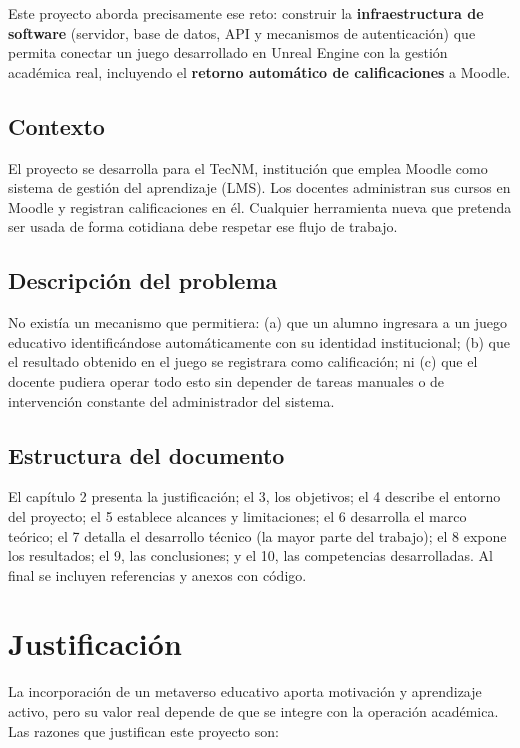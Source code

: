 \documentclass[12pt,letterpaper,oneside]{report}
\begin{document}
Este proyecto aborda precisamente ese reto: construir la \textbf{infraestructura
de software} (servidor, base de datos, API y mecanismos de autenticación) que
permita conectar un juego desarrollado en Unreal Engine con la gestión académica
real, incluyendo el \textbf{retorno automático de calificaciones} a Moodle.

\section{Contexto}
El proyecto se desarrolla para el TecNM, institución que emplea Moodle como
sistema de gestión del aprendizaje (LMS). Los docentes administran sus cursos en
Moodle y registran calificaciones en él. Cualquier herramienta nueva que
pretenda ser usada de forma cotidiana debe respetar ese flujo de trabajo.

\section{Descripción del problema}
No existía un mecanismo que permitiera: (a) que un alumno ingresara a un juego
educativo identificándose automáticamente con su identidad institucional; (b)
que el resultado obtenido en el juego se registrara como calificación; ni (c)
que el docente pudiera operar todo esto sin depender de tareas manuales o de
intervención constante del administrador del sistema.

\section{Estructura del documento}
El capítulo 2 presenta la justificación; el 3, los objetivos; el 4 describe el
entorno del proyecto; el 5 establece alcances y limitaciones; el 6 desarrolla el
marco teórico; el 7 detalla el desarrollo técnico (la mayor parte del trabajo);
el 8 expone los resultados; el 9, las conclusiones; y el 10, las competencias
desarrolladas. Al final se incluyen referencias y anexos con código.

\chapter{Justificación}

La incorporación de un metaverso educativo aporta motivación y aprendizaje
activo, pero su valor real depende de que se integre con la operación académica.
Las razones que justifican este proyecto son:
\end{document}
